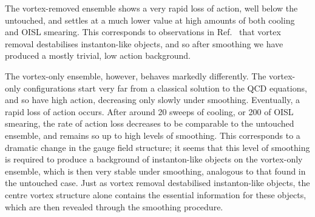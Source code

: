 \documentclass[
 reprint,
 amsmath,amssymb,
 aps,
prd,
]{revtex4-1}
\begin{document}
The vortex-removed ensemble shows a very rapid loss of action, well below the untouched, and settles at a much lower value at high amounts of both cooling and OISL smearing. This corresponds to observations in Ref.~\cite{Trewartha:2015nna} that vortex removal destabilises instanton-like objects, and so after smoothing we have produced a mostly trivial, low action background. \par
The vortex-only ensemble, however, behaves markedly differently. The vortex-only configurations start very far from a classical solution to the QCD equations, and so have high action, decreasing only slowly under smoothing. Eventually, a rapid loss of action occurs. After around 20 sweeps of cooling, or 200 of OISL smearing, the rate of action loss decreases to be comparable to the untouched ensemble, and remains so up to high levels of smoothing. This corresponds to a dramatic change in the gauge field structure; it seems that this level of smoothing is required to produce a background of instanton-like objects on the vortex-only ensemble, which is then very stable under smoothing, analogous to that found in the untouched case. Just as vortex removal destabilised instanton-like objects, the centre vortex structure alone contains the essential information for these objects, which are then revealed through the smoothing procedure.\par
\end{document}
